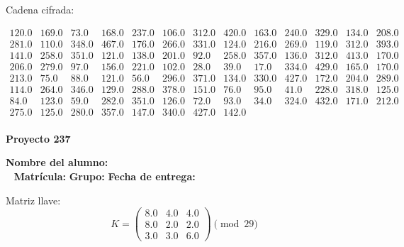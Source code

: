 \documentclass[12pt]{article}
\begin{document}
Cadena cifrada:
\begin{center}
$\begin{array}{lllllllllllll}
120.0 & 169.0 & 73.0 & 168.0 & 237.0 & 106.0 & 312.0 & 420.0 & 163.0 & 240.0 & 329.0 & 134.0 & 208.0\\
281.0 & 110.0 & 348.0 & 467.0 & 176.0 & 266.0 & 331.0 & 124.0 & 216.0 & 269.0 & 119.0 & 312.0 & 393.0\\
141.0 & 258.0 & 351.0 & 121.0 & 138.0 & 201.0 & 92.0 & 258.0 & 357.0 & 136.0 & 312.0 & 413.0 & 170.0\\
206.0 & 279.0 & 97.0 & 156.0 & 221.0 & 102.0 & 28.0 & 39.0 & 17.0 & 334.0 & 429.0 & 165.0 & 170.0\\
213.0 & 75.0 & 88.0 & 121.0 & 56.0 & 296.0 & 371.0 & 134.0 & 330.0 & 427.0 & 172.0 & 204.0 & 289.0\\
114.0 & 264.0 & 346.0 & 129.0 & 288.0 & 378.0 & 151.0 & 76.0 & 95.0 & 41.0 & 228.0 & 318.0 & 125.0\\
84.0 & 123.0 & 59.0 & 282.0 & 351.0 & 126.0 & 72.0 & 93.0 & 34.0 & 324.0 & 432.0 & 171.0 & 212.0\\
275.0 & 125.0 & 280.0 & 357.0 & 147.0 & 340.0 & 427.0 & 142.0\\
\end{array}$
\end{center}

\newpage


\textbf{Proyecto 237}

\textbf{Nombre del alumno:} \underline{\hspace{13cm}}\\\
\vspace{1cm}
\textbf{Matrícula:} \underline{\hspace{4cm}} \hspace{1cm}
\textbf{Grupo:} \underline{\hspace{2cm}}
\textbf{Fecha de entrega:} \underline{\hspace{2cm}}

\medskip

Matriz llave:
\[
K = \begin{pmatrix}
8.0 & 4.0 & 4.0\\
8.0 & 2.0 & 2.0\\
3.0 & 3.0 & 6.0
\end{pmatrix} \pmod{29}
\]
\end{document}
